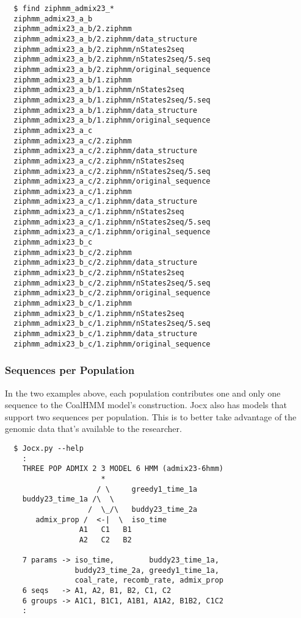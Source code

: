 {\begin{verbatim}
  $ find ziphmm_admix23_*
  ziphmm_admix23_a_b
  ziphmm_admix23_a_b/2.ziphmm
  ziphmm_admix23_a_b/2.ziphmm/data_structure
  ziphmm_admix23_a_b/2.ziphmm/nStates2seq
  ziphmm_admix23_a_b/2.ziphmm/nStates2seq/5.seq
  ziphmm_admix23_a_b/2.ziphmm/original_sequence
  ziphmm_admix23_a_b/1.ziphmm
  ziphmm_admix23_a_b/1.ziphmm/nStates2seq
  ziphmm_admix23_a_b/1.ziphmm/nStates2seq/5.seq
  ziphmm_admix23_a_b/1.ziphmm/data_structure
  ziphmm_admix23_a_b/1.ziphmm/original_sequence
  ziphmm_admix23_a_c
  ziphmm_admix23_a_c/2.ziphmm
  ziphmm_admix23_a_c/2.ziphmm/data_structure
  ziphmm_admix23_a_c/2.ziphmm/nStates2seq
  ziphmm_admix23_a_c/2.ziphmm/nStates2seq/5.seq
  ziphmm_admix23_a_c/2.ziphmm/original_sequence
  ziphmm_admix23_a_c/1.ziphmm
  ziphmm_admix23_a_c/1.ziphmm/data_structure
  ziphmm_admix23_a_c/1.ziphmm/nStates2seq
  ziphmm_admix23_a_c/1.ziphmm/nStates2seq/5.seq
  ziphmm_admix23_a_c/1.ziphmm/original_sequence
  ziphmm_admix23_b_c
  ziphmm_admix23_b_c/2.ziphmm
  ziphmm_admix23_b_c/2.ziphmm/data_structure
  ziphmm_admix23_b_c/2.ziphmm/nStates2seq
  ziphmm_admix23_b_c/2.ziphmm/nStates2seq/5.seq
  ziphmm_admix23_b_c/2.ziphmm/original_sequence
  ziphmm_admix23_b_c/1.ziphmm
  ziphmm_admix23_b_c/1.ziphmm/nStates2seq
  ziphmm_admix23_b_c/1.ziphmm/nStates2seq/5.seq
  ziphmm_admix23_b_c/1.ziphmm/data_structure
  ziphmm_admix23_b_c/1.ziphmm/original_sequence
\end{verbatim}}

\subsubsection{Sequences per Population} In the two examples above, each
population contributes one and only one sequence to the CoalHMM model's
construction. Jocx also has models that support two sequences per population.
This is to better take advantage of the genomic data that's available to the
researcher.

{\small{}\begin{verbatim}
  $ Jocx.py --help
    :
    THREE POP ADMIX 2 3 MODEL 6 HMM (admix23-6hmm)
                      *
                     / \     greedy1_time_1a
    buddy23_time_1a /\  \
                   /  \_/\   buddy23_time_2a
       admix_prop /  <-|  \  iso_time
                 A1   C1   B1
                 A2   C2   B2

    7 params -> iso_time,        buddy23_time_1a,
                buddy23_time_2a, greedy1_time_1a,
                coal_rate, recomb_rate, admix_prop
    6 seqs   -> A1, A2, B1, B2, C1, C2
    6 groups -> A1C1, B1C1, A1B1, A1A2, B1B2, C1C2
    :
\end{verbatim}}

